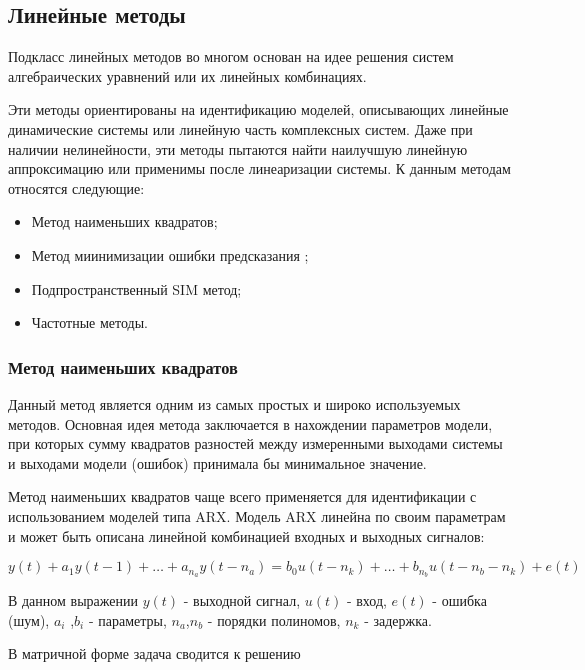 \subsection{Линейные методы}

Подкласс линейных методов во многом основан на идее решения систем
алгебраических уравнений или их линейных комбинациях. 

Эти методы ориентированы на идентификацию моделей, описывающих линейные
динамические системы или линейную часть комплексных систем. Даже при наличии
нелинейности, эти методы пытаются найти наилучшую линейную аппроксимацию или
применимы после линеаризации системы. К данным методам относятся следующие:
\begin{itemize}
  \item Метод наименьших квадратов;
  \item Метод миинимизации ошибки предсказания ;
  \item Подпространственный SIM метод;
  \item Частотные методы.
\end{itemize}

\subsubsection{Метод наименьших квадратов}

Данный метод является одним из самых простых и широко используемых методов. Основная
идея метода заключается в нахождении параметров модели, при которых сумму
квадратов разностей между измеренными выходами системы и выходами модели
(ошибок) принимала бы минимальное значение.

Метод наименьших квадратов чаще всего применяется для идентификации с
использованием моделей типа ARX. Модель ARX линейна по своим параметрам и
может быть описана линейной комбинацией входных и выходных сигналов:

\begin{equation}
  y(t)+a_1y(t-1)+\dots+a_{n_a}y(t-n_a)=b_0u(t-n_k)+\dots+b_{n_b}u(t-n_b-n_k)+e(t)
  \label{eq:arx}
\end{equation}

В данном выражении $ y(t) $ - выходной сигнал,  $u(t)$ - вход, $e(t)$ - ошибка (шум), $a_i$ ,$b_i$ - параметры, $n_a$,$n_b$ - порядки полиномов, $n_k$ - задержка.

В матричной форме задача сводится к решению

